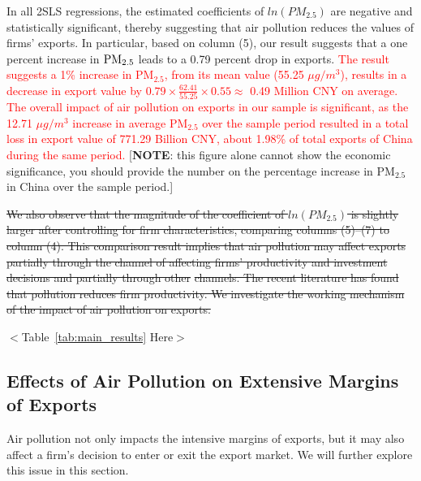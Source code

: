 \documentclass[12pt]{article}
\begin{document}
In all 2SLS regressions, the estimated coefficients of $ln(PM_{2.5})$ are
negative and statistically significant, thereby suggesting that air
pollution reduces the values of firms' exports. In particular, based on
column (5), our result suggests that a one percent increase in $\mathrm{%
PM_{2.5}}$ leads to a 0.79 percent drop in exports. \textcolor{red}{The result suggests a 1\% increase in $\mathrm{PM_{2.5}}$, from its mean value (55.25 $\mu g/m^{3}$), results in a decrease in export value by $0.79 \times \frac{62.41}
{55.25} \times 0.55 \approx $ 0.49 Million CNY on average. The overall impact of air pollution on exports in our sample is significant, as the 12.71 $\mu g/m^{3}$ increase in average $\mathrm{PM_{2.5}}$
over the sample period resulted in a total loss in export value of 771.29 Billion CNY, about 1.98\% of total exports of China during the same period.} [\textbf{NOTE}: this figure alone
cannot show the economic significance, you should provide the number on the
percentage increase in $\mathrm{PM_{2.5}}$ in China over the sample period.]

\sout{We also observe that the magnitude of the coefficient of $ln(PM_{2.5})$ is
slightly larger after controlling for firm characteristics, comparing
columns (5)--(7) to column (4). This comparison result implies that air
pollution may affect exports partially through the channel of affecting
firms' productivity and investment decisions and partially through other}
\sout{channels. The recent literature \citep{fu2021air,NBERw28401} has found that pollution reduces firm productivity. We investigate the working mechanism of the impact of air pollution on exports.}

\begin{center}
  $<$Table~\ref{tab:main_results} Here$>$
  \end{center}

  \subsection{Effects of Air Pollution on Extensive Margins of Exports}
   \label{sec:4.2} 
Air pollution not only impacts the intensive margins of exports, but it may also affect a firm's decision to enter or exit the export market. We will further explore this issue in this section.
\end{document}
